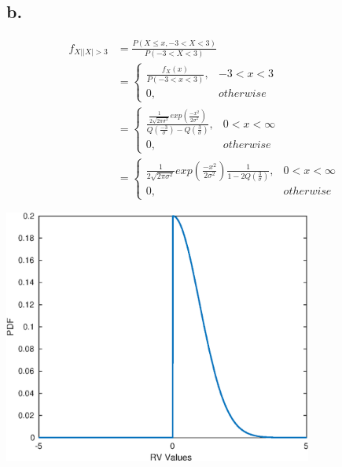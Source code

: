 \documentclass[12pt]{article}
\begin{document}
\subsection*{b.}
\begin{align*}
  f_{X||X|>3} &= \frac{P(X \leq x, -3<X<3)}{P(-3<X<3)} \\
  &= \begin{cases} 
    \frac{f_X(x)}{P(-3<x<3)}, & -3 < x < 3 \\
    0, & otherwise 
  \end{cases} \\
  &= \begin{cases} 
    \frac{\frac{1}{2\sqrt{2\pi\sigma^2}}exp(\frac{-x^2}{2\sigma^2})}
    {Q(\frac{-3}{\sigma}) - Q(\frac{3}{\sigma})}, & 0 < x < \infty \\
    0, & otherwise 
  \end{cases} \\
  &= \begin{cases} 
    \frac{1}{2\sqrt{2\pi\sigma^2}}exp(\frac{-x^2}{2\sigma^2})
    \frac{1}{1 - 2Q(\frac{3}{\sigma})}, & 0 < x < \infty \\
    0, & otherwise 
  \end{cases}
\end{align*}

\includegraphics [width=4in]{fig_3_35_b.eps}
\end{document}
